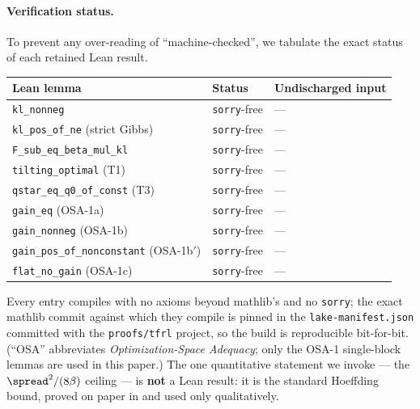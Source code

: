 \paragraph{Verification status.}
\label{app:lean-status}
To prevent any over-reading of ``machine-checked'', we tabulate the exact status of each retained Lean
result.

\begin{center}
\begin{tabular}{lll}
\hline
Lean lemma & Status & Undischarged input \\
\hline
\texttt{kl\_nonneg} & \texttt{sorry}-free & --- \\
\texttt{kl\_pos\_of\_ne} (strict Gibbs) & \texttt{sorry}-free & --- \\
\texttt{F\_sub\_eq\_beta\_mul\_kl} & \texttt{sorry}-free & --- \\
\texttt{tilting\_optimal} (T1) & \texttt{sorry}-free & --- \\
\texttt{qstar\_eq\_q0\_of\_const} (T3) & \texttt{sorry}-free & --- \\
\texttt{gain\_eq} (OSA-1a) & \texttt{sorry}-free & --- \\
\texttt{gain\_nonneg} (OSA-1b) & \texttt{sorry}-free & --- \\
\texttt{gain\_pos\_of\_nonconstant} (OSA-1b$'$) & \texttt{sorry}-free & --- \\
\texttt{flat\_no\_gain} (OSA-1c) & \texttt{sorry}-free & --- \\
\hline
\end{tabular}
\end{center}

\noindent
Every entry compiles with no axioms beyond mathlib's and no \texttt{sorry}; the exact mathlib commit
against which they compile is pinned in the \texttt{lake-manifest.json} committed with the
\texttt{proofs/tfrl} project, so the build is reproducible bit-for-bit. (``OSA'' abbreviates
\emph{Optimization-Space Adequacy}; only the OSA-1 single-block lemmas are used in this paper.) The
one quantitative statement we invoke --- the $\spread^2/(8\beta)$ ceiling --- is \textbf{not} a Lean
result: it is the standard Hoeffding bound, proved on paper in  and used only
qualitatively.


